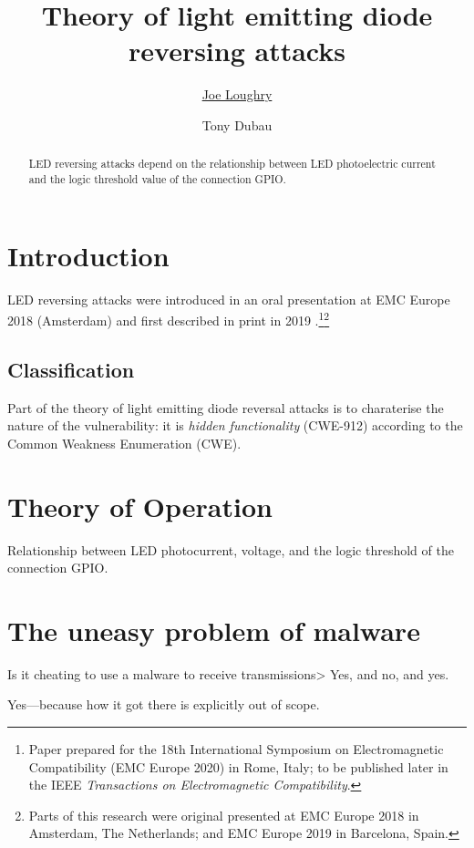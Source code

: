 \documentclass[a4paper,notitlepage]{article}
\begin{document}
\title{Theory of light emitting diode reversing attacks}
\author[1]{\href{mailto:joe.loughry@cs.du.edu}{Joe Loughry}}
\author[2]{Tony Dubau}
\maketitle
\begin{abstract}
  LED reversing attacks depend on the relationship between LED photoelectric
  current and the logic threshold value of the connection GPIO.
\end{abstract}
\maketitle
\section{Introduction}
LED reversing attacks were introduced in an oral presentation at EMC Europe
2018 (Amsterdam) and first described in print in 2019
\cite{Loughry2019}.\footnote{Paper prepared for the 18th International
Symposium on Electromagnetic Compatibility (EMC Europe 2020) in Rome, Italy;
to be published later in the IEEE \emph{Transactions on Electromagnetic
Compatibility}.}\footnote{Parts of this research were original presented at EMC
Europe 2018 in Amsterdam, The Netherlands; and EMC Europe 2019 in Barcelona,
Spain.}
\subsection{Classification}
Part of the theory of light emitting diode reversal attacks is to charaterise
the nature of the vulnerability: it is \emph{hidden functionality} (CWE-912)
according to the Common Weakness Enumeration (CWE).
\section{Theory of Operation}
Relationship between LED photocurrent, voltage, and the logic threshold of the
connection GPIO.
\section{The uneasy problem of malware}
Is it cheating to use a malware to receive transmissions> Yes, and no, and yes.

Yes---because how it got there is explicitly out of scope.
\end{document}
